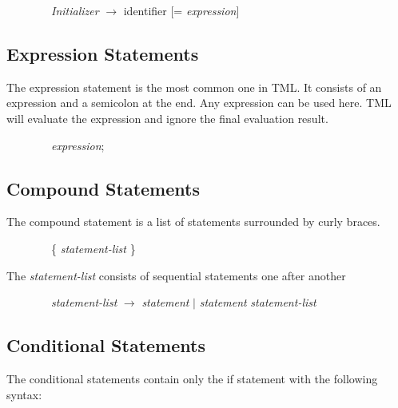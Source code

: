\documentclass[12pt,psfig,a4]{article}
\begin{document}
\begin{code}
\begin{tabbing}
~~~~~~~~\textit{Initializer} $\rightarrow$ identifier [= \textit{expression}]
\end{tabbing}
\end{code}

\subsection{Expression Statements}
The expression statement is the most common one in TML. It consists of an expression and a semicolon at the end. Any expression can be used here. TML will evaluate the expression and ignore the final evaluation result.

\begin{code}
\begin{tabbing}
~~~~~~~~\textit{expression};
\end{tabbing}
\end{code}

\subsection{Compound Statements}
The compound statement is a list of statements surrounded by curly braces.

\begin{code}
\begin{tabbing}
~~~~~~~~\{ \textit{statement-list}
\}
\end{tabbing}
\end{code}

The \textit{statement-list} consists of sequential statements one after another

\begin{code}
\begin{tabbing}
~~~~~~~~\textit{statement-list}  $\rightarrow$ \textit{statement} $\mid$ \textit{statement} \textit{statement-list}
\end{tabbing}
\end{code}

\subsection{Conditional Statements}
The conditional statements contain only the if statement with the following syntax:
\end{document}
